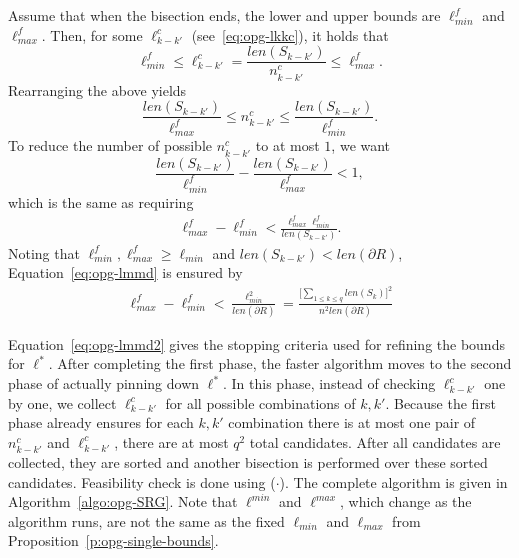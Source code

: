 Assume that when the bisection ends, the lower and upper bounds are 
$\ell_{min}^f$ and $\ell_{max}^f$. Then, for some $\ell_{k-k'}^c$
(see~\eqref{eq:opg-lkkc}), it holds that
\[
\ell_{min}^f \le \ell_{k-k'}^c = \frac{len(S_{k-k'})}{n_{k-k'}^c} \le \ell_{max}^f.
\]
Rearranging the above yields
\[
\frac{len(S_{k-k'})}{\ell_{max}^f} \le n_{k-k'}^c \le \frac{len(S_{k-k'})}{\ell_{min}^f}.
\]
To reduce the number of possible $n_{k-k'}^c$ to at most $1$, we want 
\[
\frac{len(S_{k-k'})}{\ell_{min}^f} - \frac{len(S_{k-k'})}{\ell_{max}^f} < 1, 
\]
which is the same as requiring 
\begin{align}\label{eq:opg-lmmd}
\ell_{max}^f- \ell_{min}^f <
\frac{\ell_{max}^f\ell_{min}^f}{len(S_{k-k'})}. 
\end{align}
Noting that $\ell_{min}^f, \ell_{max}^f \ge  \ell_{min}$ and $len(S_{k-k'}) < 
len (\partial R)$, Equation~\eqref{eq:opg-lmmd} is ensured by 
\begin{align}\label{eq:opg-lmmd2}
\ell_{max}^f- \ell_{min}^f 
< \frac{\ell_{min}^2}{len(\partial R)} 
= \frac{\Big[\sum_{1\le k\le q}len(S_k)\Big]^2}{n^2len(\partial R)} 
\end{align}

Equation~\eqref{eq:opg-lmmd2} gives the stopping criteria used for refining 
the bounds for $\ell^*$. After completing the first phase, the faster algorithm
moves to the second phase of actually pinning down $\ell^*$. In this phase, 
instead of checking $\ell_{k-k'}^c$ one by one, we collect $\ell_{k-k'}^c$ for
all possible combinations of $k, k'$. Because the first phase already ensures
for each $k, k'$ combination there is at most one pair of $n_{k-k'}^c$ and 
$\ell_{k-k'}^c$, there are 
at most $q^2$ total candidates. After all candidates are collected, they are 
sorted and another bisection is performed over these sorted candidates. 
Feasibility check is done using \isLFeasibleByTilingPartial($\cdot$). The 
complete algorithm is given in Algorithm~\ref{algo:opg-SRG}. Note that 
$\ell^{min}$ and $\ell^{max}$, which change as the algorithm runs, are not 
the same as the fixed $\ell_{min}$ and $\ell_{max}$ from 
Proposition~\ref{p:opg-single-bounds}. 

